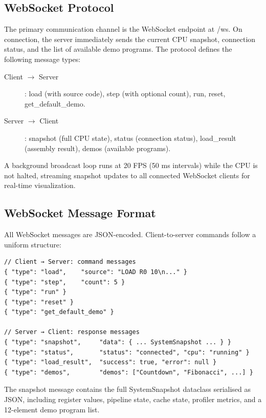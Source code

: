 \documentclass[12pt,a4paper,twoside]{book}
\theoremstyle{trinarytheorem}
\theoremstyle{trinarydefinition}
\newcommand{\code}[1]{\textsf{#1}}
\begin{document}
\subsection{WebSocket Protocol}

The primary communication channel is the WebSocket endpoint at
\code{/ws}. On connection, the server immediately sends the current
CPU snapshot, connection status, and the list of available demo programs.
The protocol defines the following message types:

\begin{description}
    \item[Client $\rightarrow$ Server]:
          \code{load} (with source code), \code{step} (with optional
          count), \code{run}, \code{reset}, \code{get\_default\_demo}.
    \item[Server $\rightarrow$ Client]:
          \code{snapshot} (full CPU state), \code{status} (connection
          status), \code{load\_result} (assembly result),
          \code{demos} (available programs).
\end{description}

A background broadcast loop runs at 20 FPS (50 ms intervals) while the
CPU is not halted, streaming snapshot updates to all connected WebSocket
clients for real-time visualization.

\subsection{WebSocket Message Format}

All WebSocket messages are JSON-encoded. Client-to-server commands follow
a uniform structure:

\begin{verbatim}
// Client → Server: command messages
{ "type": "load",    "source": "LOAD R0 10\n..." }
{ "type": "step",    "count": 5 }
{ "type": "run" }
{ "type": "reset" }
{ "type": "get_default_demo" }

// Server → Client: response messages
{ "type": "snapshot",     "data": { ... SystemSnapshot ... } }
{ "type": "status",       "status": "connected", "cpu": "running" }
{ "type": "load_result",  "success": true, "error": null }
{ "type": "demos",        "demos": ["Countdown", "Fibonacci", ...] }
\end{verbatim}

The \code{snapshot} message contains the full \code{SystemSnapshot}
dataclass serialised as JSON, including register values, pipeline state,
cache state, profiler metrics, and a 12-element demo program list.
\end{document}
